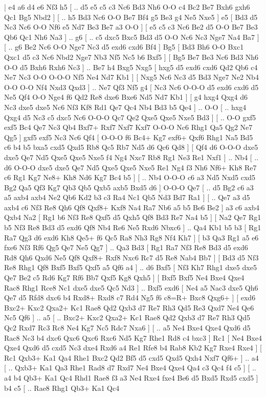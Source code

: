 \makegametitle 
|   e4   a6    d4   e6    Nf3   h5 [ .. d5  e5 c5  c3 Nc6  Bd3 Nh6  O-O c4  Bc2 Be7  Bxh6 gxh6  Qc1 Bg5  Nbd2   ]  [ .. h5  Bd3 Nc6  O-O Be7  Bf4 g5  Be3 g4  Ne5 Nxe5   ]  e5 [  Bd3 d5  Nc3 Nc6  O-O Nf6  e5 Nd7  Be3 Be7  a3 O-O   ]  [  e5 c5  c3 Nc6  Be2 d5  O-O Be7  Be3 Qb6  Qc1 Nh6  Na3   ] .. g6 [ .. c5  dxc5 Bxc5  Bd3 d5  O-O Nc6  Nc3 Nge7  Na4 Ba7   ]  [ .. g6  Be2 Nc6  O-O Nge7  Nc3 d5  exd6 cxd6  Bf4   ]  Bg5 [  Bd3 Bh6  O-O Bxc1  Qxc1 d5  c3 Nc6  Nbd2 Nge7  Nb3 Nf5  Nc5 b6  Bxf5   ]  [  Bg5 Be7  Be3 Nc6  Bd3 Nh6  O-O d5  Bxh6 Rxh6  Nc3   ] .. Be7    h4   Bxg5    Nxg5 [  hxg5 d5  exd6 cxd6  Qd2 Qb6  c4 Ne7  Nc3 O-O  O-O-O Nf5  Ne4 Nd7  Kb1   ]  [  Nxg5 Nc6  Nc3 d5  Bd3 Nge7  Ne2 Nb4  O-O O-O  Nf4 Nxd3  Qxd3   ] .. Ne7    Qf3   Nf5    g4 [  Nc3 Nc6  O-O-O d5  exd6 cxd6  d5 Ne5  Qf4 O-O  Nge4 f6  Qd2 Re8  dxe6 Bxe6  Nd5 Nd7  Kb1   ]  [  g4 hxg4  Qxg4 d6  Nc3 dxe5  dxe5 Nc6  Nf3 Kf8  Rd1 Qe7  Qc4 Nb4  Bd3 b5  Qe4   ] .. O-O [ .. hxg4  Qxg4 d5  Nc3 c5  dxc5 Nc6  O-O-O Qc7  Qe2 Qxe5  Qxe5 Nxe5  Bd3   ]  [ .. O-O  gxf5 exf5  Bc4 Qe7  Nc3 Qb4  Bxf7+ Rxf7  Nxf7 Kxf7  O-O-O Nc6  Rhg1 Qa5  Qg2 Ne7  Qg5   ]  gxf5   exf5    Nc3   Nc6    Qf4 [  O-O-O f6  Bc4+ Kg7  exf6+ Qxf6  Rhg1 Na5  Bd5 c6  b4 b5  bxa5 cxd5  Qxd5 Rb8  Qc5 Rb7  Nd5 d6  Qc6 Qd8   ]  [  Qf4 d6  O-O-O dxe5  dxe5 Qe7  Nd5 Qxe5  Qxe5 Nxe5  f4 Ng4  Nxc7 Rb8  Rg1 Ne3  Re1 Nxf1   ] .. Nb4 [ .. d6  O-O-O dxe5  dxe5 Qe7  Nd5 Qxe5  Qxe5 Nxe5  Re1 Ng4  f3 Nh6  Nf6+ Kh8  Re7 c6  Rg1 Kg7  Ne8+ Kh8  Nd6 Kg7  Bc4 b5   ]  [ .. Nb4  O-O-O c6  a3 Nd5  Nxd5 cxd5  Bg2 Qa5  Qf3 Kg7  Qb3 Qb5  Qxb5 axb5  Bxd5 d6   ]  O-O-O   Qe7 [ .. d5  Bg2 c6  a3 a5  axb4 axb4  Ne2 Qb6  Kd2 b3  c3 Ra4  Nc1 Qb5  Nd3 Bd7  Ra1   ]  [ .. Qe7  a3 d5  axb4 c6  Nf3 Re8  Qh6 Qf8  Qxf8+ Kxf8  Na4 Ra7  Nb6 a5  b5 Be6  Be2   ]  a3   c6    axb4   Qxb4    Na2 [  Rg1 b6  Nf3 Re8  Qxf5 d5  Qxh5 Qf8  Bd3 Re7  Na4 b5   ]  [  Na2 Qe7  Rg1 b5  Nf3 Re8  Bd3 d5  exd6 Qf8  Nb4 Re6  Ne5 Rxd6  Nbxc6   ] .. Qa4    Kb1   b5    b3 [  Rg1 Ra7  Qg3 d6  exd6 Kh8  Qe5+ f6  Qc5 Ra8  Nh3 Rg8  Nf4 Kh7   ]  [  b3 Qa3  Rg1 a5  e6 fxe6  Nf3 Rf6  Qg5 Qe7  Ne5 Qg7   ] .. Qa3    Bd3 [  Rg1 Ra7  Nf3 Re8  Bd3 d5  exd6 Rd8  Qh6 Qxd6  Ne5 Qf8  Qxf8+ Rxf8  Nxc6 Rc7  d5 Re8  Nab4 Bb7   ]  [  Bd3 d5  Nf3 Re8  Rhg1 Qf8  Bxf5 Bxf5  Qxf5 a5  Qf6 a4   ] .. d6    Bxf5 [  Nf3 Kh7  Rhg1 dxe5  dxe5 Qe7  Be2 c5  Rd6 Kg7  Rf6 Bb7  Qxf5 Kg8  Qxh5   ]  [  Bxf5 Bxf5  Ne4 Bxe4  Qxe4 Rac8  Rhg1 Rce8  Nc1 dxe5  dxe5 Qc5  Nd3   ] .. Bxf5    exd6 [  Ne4 a5  Nac3 dxe5  Qh6 Qe7  d5 Rfd8  dxc6 b4  Rxd8+ Rxd8  c7 Rd4  Ng5 f6  c8=R+ Bxc8  Qxg6+   ]  [  exd6 Bxc2+  Kxc2 Qxa2+  Kc1 Rae8  Qd2 Qxb3  d7 Re7  Rh3 Qd5  Re3 Qxd7  Ne4 Qe6  Nc5 Qf6   ] .. a5 [ .. Bxc2+  Kxc2 Qxa2+  Kc1 Rae8  Qd2 Qxb3  d7 Re7  Rh3 Qd5  Qc2 Rxd7  Rc3 Rc8  Ne4 Kg7  Nc5 Rdc7  Nxa6   ]  [ .. a5  Ne4 Bxe4  Qxe4 Qxd6  d5 Rac8  Nc3 b4  dxc6 Qxc6  Qxc6 Rxc6  Nd5 Kg7  Rhe1 Rd8  c4 bxc3   ]  Rc1 [  Ne4 Bxe4  Qxe4 Qxd6  d5 cxd5  Nc3 dxe4  Rxd6 a4  Re1 Rfe8  b4 Rab8  Kb2 Kg7  Rxe4 Rxe4   ]  [  Rc1 Qxb3+  Ka1 Qa4  Rhe1 Bxc2  Qd2 Bf5  d5 cxd5  Qxd5 Qxh4  Nxf7 Qf6+   ] .. a4 [ .. Qxb3+  Ka1 Qa3  Rhe1 Rad8  d7 Rxd7  Ne4 Bxe4  Qxe4 Qa4  c3 Qc4  f4 c5   ]  [ .. a4  b4 Qb3+  Ka1 Qc4  Rhd1 Rae8  f3 a3  Ne4 Rxe4  fxe4 Be6  d5 Bxd5  Rxd5 cxd5   ]  b4   c5 [ .. Rae8  Rhg1 Qb3+  Ka1 Qc4  